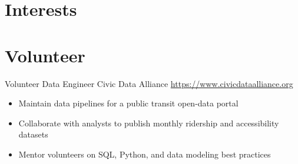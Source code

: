 \documentclass[a4paper, serif, 10pt]{moderncv}
\begin{document}
\section{Interests}

\section{Volunteer}

        {Volunteer Data Engineer}
        {Civic Data Alliance}
        {\url{https://www.civicdataalliance.org}}
        {}
        {\begin{itemize}
\item Maintain data pipelines for a public transit open-data portal
\item Collaborate with analysts to publish monthly ridership and accessibility datasets
\item Mentor volunteers on SQL, Python, and data modeling best practices
\end{itemize}}
    
\end{document}
